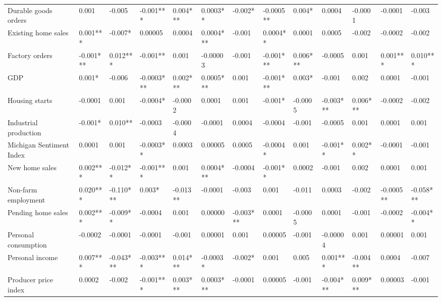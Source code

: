 \begin{landscape}
\begin{table}[]
{\begin{tabular}{lllllllllllll}
Durable goods orders     & 0.001     & -0.005    & -0.001***  & 0.004*** & 0.0003**  & -0.002*   & -0.0005** & 0.004*   & 0.0004    & -0.0001   & -0.0001    & -0.003    \\
Existing home sales      & 0.001***  & -0.007*   & 0.00005    & 0.0004   & 0.0004*** & -0.001    & 0.0004**  & 0.0001   & 0.0005    & -0.002    & -0.0002    & -0.002    \\
Factory orders           & -0.001*** & 0.012***  & -0.001**   & 0.001    & -0.00003  & -0.001    & -0.001*** & 0.006*** & -0.0005   & 0.001     & 0.001***   & 0.010***  \\
GDP                      & 0.001*    & -0.006    & -0.0003*** & 0.002*** & 0.0005*** & 0.001     & -0.001*** & 0.003*   & -0.001    & 0.002     & 0.0001     & -0.001    \\
Housing starts           & -0.0001   & 0.001     & -0.0004*   & -0.0002  & 0.0001    & 0.001     & -0.001*   & -0.0005  & -0.003*** & 0.006***  & -0.0002    & -0.002    \\
Industrial production    & -0.001*   & 0.010**   & -0.0003    & -0.0004  & -0.0001   & 0.0004    & -0.0004   & -0.001   & -0.0005   & 0.001     & 0.0001     & 0.001     \\
Michigan Sentiment Index & 0.0001    & 0.001     & -0.0003**  & 0.0003   & 0.00005   & 0.0005    & -0.0004*  & 0.001    & -0.001**  & 0.002**   & -0.0001    & -0.001    \\
New home sales           & 0.002***  & -0.012**  & -0.001***  & 0.001    & 0.0004*** & -0.0004   & -0.001**  & 0.0002   & -0.001    & 0.002     & 0.0001     & 0.001     \\
Non-farm employment      & 0.020***  & -0.110*** & 0.003*     & -0.013** & -0.0001   & -0.003    & 0.001     & -0.011   & 0.0003    & -0.002    & -0.0005**  & -0.058*** \\
Pending home sales       & 0.002***  & -0.009**  & -0.0004    & 0.001    & 0.00000   & -0.003*** & 0.0001    & -0.0005  & 0.0001    & -0.001    & -0.0002    & -0.004**  \\
Personal consumption     & -0.0002   & -0.0001   & -0.0001    & -0.001   & 0.00001   & 0.001     & 0.00005   & -0.001   & -0.00004  & 0.001     & 0.00001    & 0.001     \\
Personal income          & 0.007***  & -0.043*** & -0.003***  & 0.014*** & -0.0003*  & -0.002*   & 0.001     & 0.005    & 0.001***  & -0.004**  & 0.0004     & -0.007    \\
Producer price index     & 0.0002    & -0.002    & -0.001***  & 0.003*** & 0.0003*** & -0.0001   & 0.00005   & -0.001   & -0.004*** & 0.009***  & 0.00003    & -0.001    \\

\end{tabular}}
\end{table}
\end{landscape}
